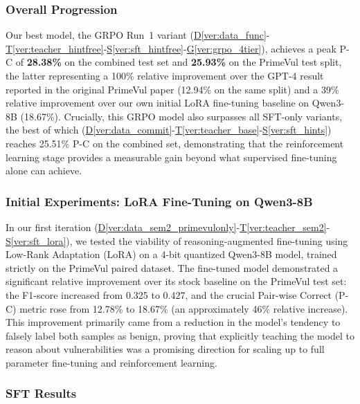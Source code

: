 \documentclass[12pt,a4paper]{article}
\newcommand{\vcode}[4]{\hyperref[#1]{D\ref*{#1}}-\hyperref[#2]{T\ref*{#2}}-\hyperref[#3]{S\ref*{#3}}-\hyperref[#4]{G\ref*{#4}}}
\newcommand{\vcodeSFT}[3]{\hyperref[#1]{D\ref*{#1}}-\hyperref[#2]{T\ref*{#2}}-\hyperref[#3]{S\ref*{#3}}}
\begin{document}
\subsubsection{Overall Progression}

Our best model, the GRPO Run~1 variant (\vcode{ver:data_func}{ver:teacher_hintfree}{ver:sft_hintfree}{ver:grpo_4tier}), achieves a peak P-C of \textbf{28.38\%} on the combined test set and \textbf{25.93\%} on the PrimeVul test split, the latter representing a 100\% relative improvement over the GPT-4 result reported in the original PrimeVul paper (12.94\% on the same split) and a 39\% relative improvement over our own initial LoRA fine-tuning baseline on Qwen3-8B (18.67\%). Crucially, this GRPO model also surpasses all SFT-only variants, the best of which (\vcodeSFT{ver:data_commit}{ver:teacher_base}{ver:sft_hints}) reaches 25.51\% P-C on the combined set, demonstrating that the reinforcement learning stage provides a measurable gain beyond what supervised fine-tuning alone can achieve.

\subsubsection{Initial Experiments: LoRA Fine-Tuning on Qwen3-8B}
In our first iteration (\vcodeSFT{ver:data_sem2_primevulonly}{ver:teacher_sem2}{ver:sft_lora}), we tested the viability of reasoning-augmented fine-tuning using Low-Rank Adaptation (LoRA) on a 4-bit quantized Qwen3-8B model, trained strictly on the PrimeVul paired dataset. The fine-tuned model demonstrated a significant relative improvement over its stock baseline on the PrimeVul test set: the F1-score increased from 0.325 to 0.427, and the crucial Pair-wise Correct (P-C) metric rose from 12.78\% to 18.67\% (an approximately 46\% relative increase). This improvement primarily came from a reduction in the model's tendency to falsely label both samples as benign, proving that explicitly teaching the model to reason about vulnerabilities was a promising direction for scaling up to full parameter fine-tuning and reinforcement learning.

\subsubsection{SFT Results}
\end{document}

